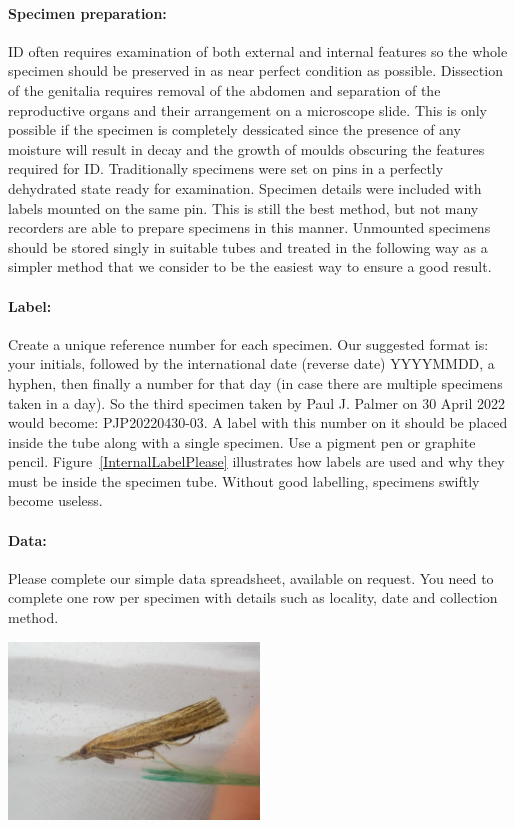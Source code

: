 \documentclass[12pt]{article}
\begin{document}
	\paragraph{Specimen preparation:} ID often requires examination of both external and internal features so the whole specimen should be preserved in as near perfect condition as possible. Dissection of the genitalia requires removal of the abdomen and separation of the reproductive organs and their arrangement on a microscope slide. This is only possible if the specimen is completely dessicated since the presence of any moisture will result in decay and the growth of moulds obscuring the features required for ID. Traditionally specimens were set on pins in a perfectly dehydrated state ready for examination. Specimen details were included  with labels mounted on the same pin. This is still the best method, but not many recorders are able to prepare specimens in this manner. Unmounted specimens should be stored singly in suitable tubes and treated in the following way as a simpler method that we consider to be the easiest way to ensure a good result. 
	

	
	

	\paragraph{Label:} Create a unique reference number for each specimen. Our suggested format is: your initials, followed by the international date (reverse date) YYYYMMDD, a hyphen, then finally a number for that day (in case there are multiple specimens taken in a day). So the third specimen taken by Paul J. Palmer on 30 April 2022 would become: PJP20220430-03. A label with this number on it should be placed inside the tube along with a single specimen. Use a pigment pen or graphite pencil. Figure~\ref{InternalLabelPlease} illustrates how labels are used and why they must be inside the specimen tube. Without good labelling, specimens swiftly become useless. 
	\paragraph{Data:} Please complete our simple data spreadsheet, available on request. You need to complete one row per specimen with details such as locality, date and collection method. 
	
			\begin{center}
		\centering
		\includegraphics[width=0.5\textwidth]{images/contaminella}\hfill
		\label{TakePhotgraphs}
	\end{center}
\end{document}
